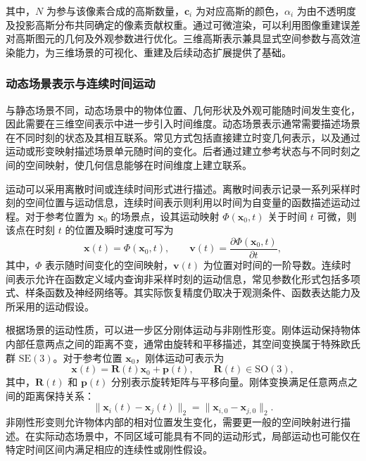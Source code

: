 其中，$N$ 为参与该像素合成的高斯数量，$\mathbf{c}_i$ 为对应高斯的颜色，$\alpha_i$ 为由不透明度及投影高斯分布共同确定的像素贡献权重。通过可微渲染，可以利用图像重建误差对高斯图元的几何及外观参数进行优化。三维高斯表示兼具显式空间参数与高效渲染能力，为三维场景的可视化、重建及后续动态扩展提供了基础。


\subsubsection{动态场景表示与连续时间运动}

与静态场景不同，动态场景中的物体位置、几何形状及外观可能随时间发生变化，因此需要在三维空间表示中进一步引入时间维度。动态场景表示通常需要描述场景在不同时刻的状态及其相互联系。常见方式包括直接建立时变几何表示，以及通过运动或形变映射描述场景单元随时间的变化。后者通过建立参考状态与不同时刻之间的空间映射，使几何信息能够在时间维度上建立联系\cite{dnerf2021,nerfies2021,nsff2021,dynamicgs2024,gs4d2024}。

运动可以采用离散时间或连续时间形式进行描述。离散时间表示记录一系列采样时刻的空间位置与运动信息，连续时间表示则利用以时间为自变量的函数描述运动过程。对于参考位置为 $\mathbf{x}_0$ 的场景点，设其运动映射 $\Phi(\mathbf{x}_0,t)$ 关于时间 $t$ 可微，则该点在时刻 $t$ 的位置及瞬时速度可写为
\begin{equation}
  \mathbf{x}(t)=\Phi(\mathbf{x}_0,t),
  \qquad
  \mathbf{v}(t)=\frac{\partial\Phi(\mathbf{x}_0,t)}{\partial t},
  \label{eq:plan-motion-mapping}
\end{equation}
其中，$\Phi$ 表示随时间变化的空间映射，$\mathbf{v}(t)$ 为位置对时间的一阶导数。连续时间表示允许在函数定义域内查询非采样时刻的运动信息，常见参数化形式包括多项式、样条函数及神经网络等。其实际恢复精度仍取决于观测条件、函数表达能力及所采用的运动假设。

根据场景的运动性质，可以进一步区分刚体运动与非刚性形变。刚体运动保持物体内部任意两点之间的距离不变，通常由旋转和平移描述，其空间变换属于特殊欧氏群 $\mathrm{SE}(3)$。对于参考位置 $\mathbf{x}_0$，刚体运动可表示为
\[
  \mathbf{x}(t)=\mathbf{R}(t)\mathbf{x}_0+\mathbf{p}(t),
  \qquad
  \mathbf{R}(t)\in\mathrm{SO}(3),
\]
其中，$\mathbf{R}(t)$ 和 $\mathbf{p}(t)$ 分别表示旋转矩阵与平移向量。刚体变换满足任意两点之间的距离保持关系：
\[
  \|\mathbf{x}_i(t)-\mathbf{x}_j(t)\|_2
  =
  \|\mathbf{x}_{i,0}-\mathbf{x}_{j,0}\|_2.
\]
非刚性形变则允许物体内部的相对位置发生变化，需要更一般的空间映射进行描述。在实际动态场景中，不同区域可能具有不同的运动形式，局部运动也可能仅在特定时间区间内满足相应的连续性或刚性假设。




